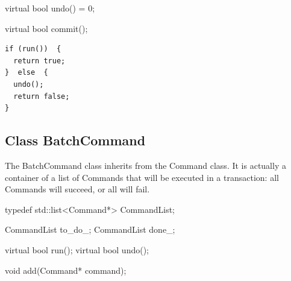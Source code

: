 \begin{apient}
virtual bool undo() = 0;
\end{apient}



\begin{apient}
virtual bool commit();
\end{apient}



\begin{lstlisting}
if (run())  {
  return true;
}  else  {
  undo();
  return false;
}
\end{lstlisting}

\subsection{Class BatchCommand}
\label{sec:batchcommand}


The BatchCommand class inherits from the Command class. It is actually a
container of a list of Commands that will be executed in a transaction: all
Commands will succeed, or all will fail.


\begin{apient}
typedef std::list<Command*> CommandList;

CommandList to_do_;
CommandList done_;
\end{apient}



\begin{apient}
virtual bool run();
virtual bool undo();
\end{apient}


\begin{apient}
void add(Command* command);
\end{apient}



